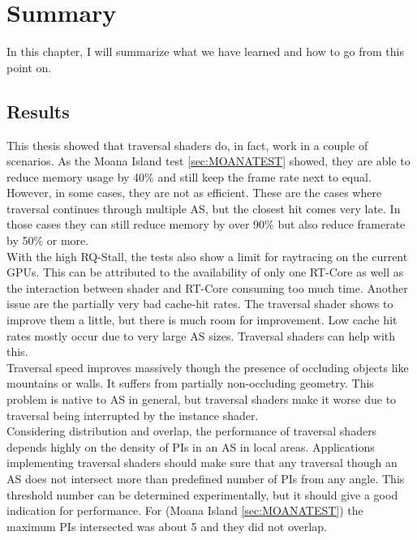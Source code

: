 \chapter{Summary}
In this chapter, I will summarize what we have learned and how to go from this point on.
\section{Results}
This thesis showed that traversal shaders do, in fact, work in a couple of scenarios. As the Moana Island test \ref{sec:MOANATEST} showed, they are able to reduce memory usage by 40\% and still keep the frame rate next to equal. However, in some cases, they are not as efficient. These are the cases where traversal continues through multiple AS, but the closest hit comes very late. In those cases they can still reduce memory by over 90\% but also reduce framerate by 50\% or more.\\
With the high RQ-Stall, the tests also show a limit for raytracing on the current GPUs. This can be attributed to the availability of only one RT-Core as well as the interaction between shader and RT-Core consuming too much time. Another issue are the partially very bad cache-hit rates. The traversal shader shows to improve them a little, but there is much room for improvement. Low cache hit rates mostly occur due to very large AS sizes. Traversal shaders can help with this.\\
Traversal speed improves massively though the presence of occluding objects like mountains or walls. It suffers from partially non-occluding geometry. This problem is native to AS in general, but traversal shaders make it worse due to traversal being interrupted by the instance shader.\\
Considering distribution and overlap, the performance of traversal shaders depends highly on the density of PIs in an AS in local areas. Applications implementing traversal shaders should make sure that any traversal though an AS does not intersect more than predefined number of PIs from any angle. This threshold number can be determined experimentally, but it should give a good indication for performance. For (Moana Island \ref{sec:MOANATEST}) the maximum PIs intersected was about 5 and they did not overlap.
